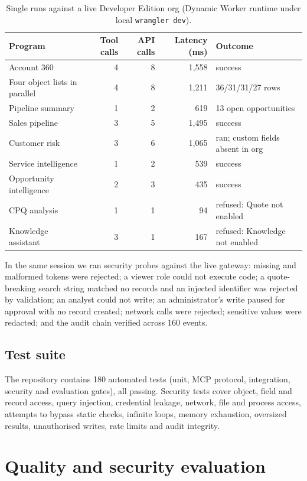 \documentclass[11pt]{article}
\begin{document}
\begin{table}[t]
\centering\small
\caption{Single runs against a live Developer Edition org (Dynamic Worker runtime under local \texttt{wrangler dev}).}
\label{tab:live}
\begin{tabular}{lrrrl}
\toprule
Program & Tool calls & API calls & Latency (ms) & Outcome\\
\midrule
Account 360 & 4 & 8 & 1{,}558 & success\\
Four object lists in parallel & 4 & 8 & 1{,}211 & 36/31/31/27 rows\\
Pipeline summary & 1 & 2 & 619 & 13 open opportunities\\
Sales pipeline & 3 & 5 & 1{,}495 & success\\
Customer risk & 3 & 6 & 1{,}065 & ran; custom fields absent in org\\
Service intelligence & 1 & 2 & 539 & success\\
Opportunity intelligence & 2 & 3 & 435 & success\\
CPQ analysis & 1 & 1 & 94 & refused: Quote not enabled\\
Knowledge assistant & 3 & 1 & 167 & refused: Knowledge not enabled\\
\bottomrule
\end{tabular}
\end{table}

In the same session we ran security probes against the live gateway: missing and malformed tokens were rejected; a viewer role could not execute code; a quote-breaking search string matched no records and an injected identifier was rejected by validation; an analyst could not write; an administrator's write paused for approval with no record created; network calls were rejected; sensitive values were redacted; and the audit chain verified across 160 events.

\subsection{Test suite}
The repository contains 180 automated tests (unit, MCP protocol, integration, security and evaluation gates), all passing. Security tests cover object, field and record access, query injection, credential leakage, network, file and process access, attempts to bypass static checks, infinite loops, memory exhaustion, oversized results, unauthorised writes, rate limits and audit integrity.

\section{Quality and security evaluation}\label{sec:quality}
\end{document}
